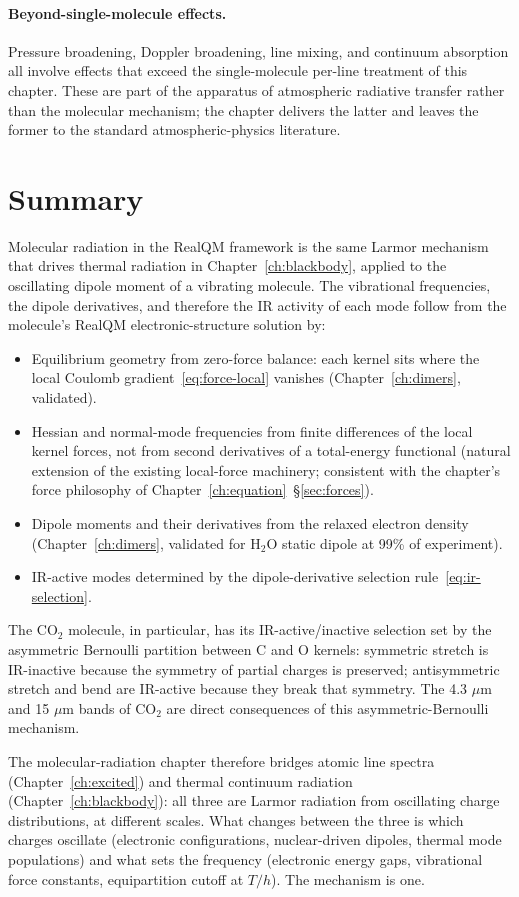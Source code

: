 \paragraph{Beyond-single-molecule effects.}
Pressure broadening, Doppler broadening, line mixing, and continuum absorption all involve effects that exceed the single-molecule per-line treatment of this chapter. These are part of the apparatus of atmospheric radiative transfer rather than the molecular mechanism; the chapter delivers the latter and leaves the former to the standard atmospheric-physics literature.

\section{Summary}\label{sec:molrad-summary}

Molecular radiation in the RealQM framework is the same Larmor mechanism that drives thermal radiation in Chapter~\ref{ch:blackbody}, applied to the oscillating dipole moment of a vibrating molecule. The vibrational frequencies, the dipole derivatives, and therefore the IR activity of each mode follow from the molecule's RealQM electronic-structure solution by:

\begin{itemize}
\item Equilibrium geometry from zero-force balance: each kernel sits where the local Coulomb gradient~\eqref{eq:force-local} vanishes (Chapter~\ref{ch:dimers}, validated).
\item Hessian and normal-mode frequencies from finite differences of the local kernel forces, not from second derivatives of a total-energy functional (natural extension of the existing local-force machinery; consistent with the chapter's force philosophy of Chapter~\ref{ch:equation}~\S\ref{sec:forces}).
\item Dipole moments and their derivatives from the relaxed electron density (Chapter~\ref{ch:dimers}, validated for H$_2$O static dipole at 99\% of experiment).
\item IR-active modes determined by the dipole-derivative selection rule~\eqref{eq:ir-selection}.
\end{itemize}

The CO$_2$ molecule, in particular, has its IR-active/inactive selection set by the asymmetric Bernoulli partition between C and O kernels: symmetric stretch is IR-inactive because the symmetry of partial charges is preserved; antisymmetric stretch and bend are IR-active because they break that symmetry. The 4.3 $\mu$m and 15 $\mu$m bands of CO$_2$ are direct consequences of this asymmetric-Bernoulli mechanism.

The molecular-radiation chapter therefore bridges atomic line spectra (Chapter~\ref{ch:excited}) and thermal continuum radiation (Chapter~\ref{ch:blackbody}): all three are Larmor radiation from oscillating charge distributions, at different scales. What changes between the three is which charges oscillate (electronic configurations, nuclear-driven dipoles, thermal mode populations) and what sets the frequency (electronic energy gaps, vibrational force constants, equipartition cutoff at $T/h$). The mechanism is one.

